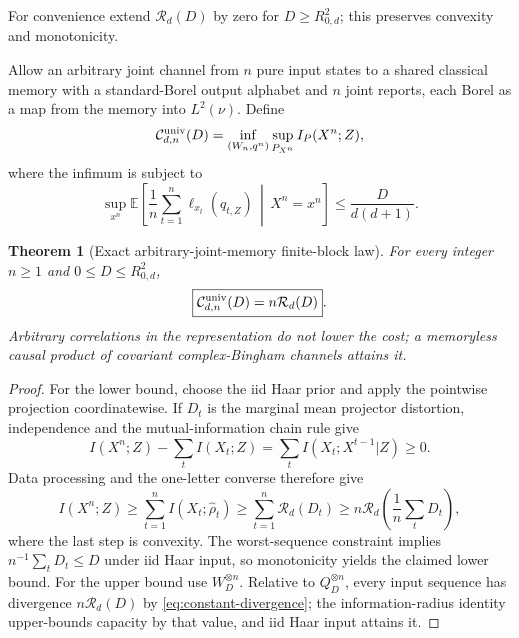 \documentclass[11pt,a4paper]{article}
\newtheorem{theorem}{Theorem}[section]
\theoremstyle{remark}
\newcommand{\E}{\mathbb{E}}
\newcommand{\cR}{\mathcal{R}}
\newcommand{\cC}{\mathcal{C}}
\begin{document}
For convenience extend $\cR_d(D)$ by zero for $D\ge R_{0,d}^2$; this
preserves convexity and monotonicity.

Allow an arbitrary joint channel from $n$ pure input states to a shared
classical memory with a standard-Borel output alphabet and $n$ joint reports,
each Borel as a map from the memory into $L^2(\nu)$.  Define
\begin{equation}
 \cC_{d,n}^{\rm univ}(D)=
 \inf_{(W_n,q^n)}\sup_{P_{X^n}} I_P(X^n;Z),
 \label{eq:block-definition}
\end{equation}
where the infimum is subject to
\begin{equation}
 \sup_{x^n}\E\left[
 \frac1n\sum_{t=1}^n\ell_{x_t}(q_{t,Z})\,\middle|\,X^n=x^n
 \right]\le\frac{D}{d(d+1)}.
 \label{eq:block-risk}
\end{equation}

\begin{theorem}[Exact arbitrary-joint-memory finite-block law]
\label{thm:block}
For every integer $n\ge1$ and $0\le D\le R_{0,d}^2$,
\begin{equation}
 \boxed{\cC_{d,n}^{\rm univ}(D)=n\cR_d(D)}.
 \label{eq:block-equality}
\end{equation}
Arbitrary correlations in the representation do not lower the cost; a
memoryless causal product of covariant complex-Bingham channels attains it.
\end{theorem}

\begin{proof}
For the lower bound, choose the iid Haar prior and apply the pointwise
projection coordinatewise.  If $D_t$ is the marginal mean projector
distortion, independence and the mutual-information chain rule give
\begin{equation}
 I(X^n;Z)-\sum_t I(X_t;Z)
 =\sum_t I(X_t;X^{t-1}|Z)\ge0.
\end{equation}
Data processing and the one-letter converse therefore give
\begin{equation}
 I(X^n;Z)\ge\sum_{t=1}^n I(X_t;\widehat\rho_t)
 \ge\sum_{t=1}^n\cR_d(D_t)
 \ge n\cR_d\!\left(\frac1n\sum_tD_t\right),
\end{equation}
where the last step is convexity.  The worst-sequence constraint implies
$n^{-1}\sum_tD_t\le D$ under iid Haar input, so monotonicity yields the
claimed lower bound.  For the upper bound use
$W_D^{\otimes n}$.  Relative to $Q_D^{\otimes n}$, every input sequence has
divergence $n\cR_d(D)$ by \eqref{eq:constant-divergence}; the
information-radius identity upper-bounds capacity by that value, and iid Haar
input attains it.
\end{proof}
\end{document}
